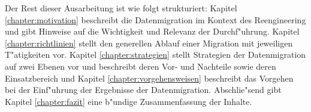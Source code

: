 \lb
Der Rest dieser Ausarbeitung ist wie folgt strukturiert: Kapitel \ref{chapter:motivation} beschreibt die Datenmigration im Kontext des Reengineering und gibt Hinweise auf die Wichtigkeit und Relevanz der Durchf"uhrung. Kapitel \ref{chapter:richtlinien} stellt den generellen Ablauf einer Migration mit jeweiligen T"atigkeiten vor. Kapitel \ref{chapter:strategien} stellt Strategien der Datenmigration auf zwei Ebenen vor und beschreibt deren Vor- und Nachteile sowie deren Einsatzbereich und Kapitel \ref{chapter:vorgehensweisen} beschreibt das Vorgehen bei der Einf"uhrung der Ergebnisse der Datenmigration. Abschlie"send gibt Kapitel \ref{chapter:fazit} eine b"undige Zusammenfassung der Inhalte.